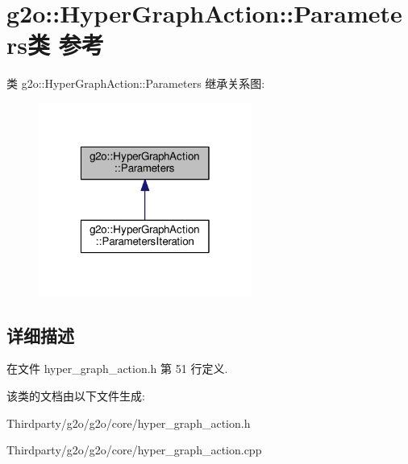 \hypertarget{classg2o_1_1HyperGraphAction_1_1Parameters}{\section{g2o\-:\-:Hyper\-Graph\-Action\-:\-:Parameters类 参考}
\label{classg2o_1_1HyperGraphAction_1_1Parameters}
}


类 g2o\-:\-:Hyper\-Graph\-Action\-:\-:Parameters 继承关系图\-:
\nopagebreak
\begin{figure}[H]
\begin{center}
\leavevmode
\includegraphics[width=198pt]{classg2o_1_1HyperGraphAction_1_1Parameters__inherit__graph}
\end{center}
\end{figure}


\subsection{详细描述}


在文件 hyper\-\_\-graph\-\_\-action.\-h 第 51 行定义.



该类的文档由以下文件生成\-:\begin{DoxyCompactItemize}
\item 
Thirdparty/g2o/g2o/core/hyper\-\_\-graph\-\_\-action.\-h\item 
Thirdparty/g2o/g2o/core/hyper\-\_\-graph\-\_\-action.\-cpp\end{DoxyCompactItemize}
